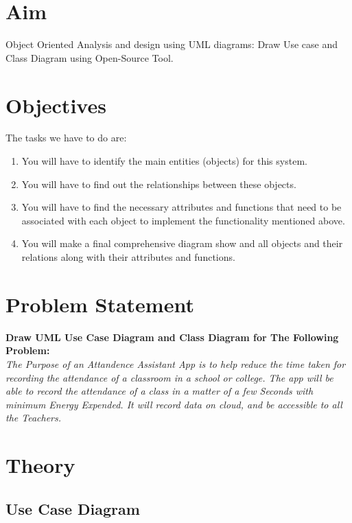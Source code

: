 \documentclass[11pt]{article}
\begin{document}
\tableofcontents
\thispagestyle{empty}
\clearpage

\setcounter{page}{1}

\section{Aim}
Object Oriented Analysis and design using UML diagrams: Draw Use case and Class
Diagram using Open-Source Tool.

\section{Objectives}

The tasks we have to do are:
\begin{enumerate}
	\item You will have to identify the main entities (objects) for this system.
	\item You will have to find out the relationships between these objects.
	\item You will have to find the necessary attributes and functions that need to be associated
	      with each object to implement the functionality mentioned above.
	\item You will make a final comprehensive diagram show and all objects and their relations
	      along with their attributes and functions.
\end{enumerate}

\section{Problem Statement}

\textbf{Draw UML Use Case Diagram and Class Diagram for The Following Problem:} \\

\textit{The Purpose of an Attandence Assistant App is to help reduce the time taken for recording the attendance of a classroom in a school or college. The app will be able to record the attendance of a class in a matter of a few Seconds with minimum Energy Expended. It will record data on cloud, and be accessible to all the Teachers.}\\

\section{Theory}

\subsection{Use Case Diagram}
\end{document}
